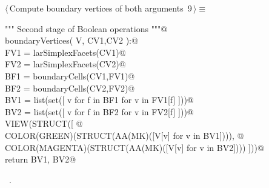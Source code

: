 \documentclass[11pt,oneside]{article}	%
\begin{document}
\begin{flushleft} \small \label{scrap14}
\protect{}$\langle\,$Compute boundary vertices of both arguments\nobreak\ {\footnotesize 9}$\,\rangle\equiv$
\vspace{-1ex}
\begin{list}{}{} \item
\mbox{}\verb@""" Second stage of Boolean operations """@\\
\mbox{}\verb@def boundaryVertices( V, CV1,CV2 ):@\\
\mbox{}\verb@   FV1 = larSimplexFacets(CV1)@\\
\mbox{}\verb@   FV2 = larSimplexFacets(CV2)@\\
\mbox{}\verb@   BF1 = boundaryCells(CV1,FV1)@\\
\mbox{}\verb@   BF2 = boundaryCells(CV2,FV2)@\\
\mbox{}\verb@   BV1 = list(set([ v for f in BF1 for v in FV1[f] ]))@\\
\mbox{}\verb@   BV2 = list(set([ v for f in BF2 for v in FV2[f] ]))@\\
\mbox{}\verb@   VIEW(STRUCT([ @\\
\mbox{}\verb@      COLOR(GREEN)(STRUCT(AA(MK)([V[v] for v in BV1]))), @\\
\mbox{}\verb@      COLOR(MAGENTA)(STRUCT(AA(MK)([V[v] for v in BV2]))) ]))@\\
\mbox{}\verb@   return BV1, BV2@\\
\mbox{}\verb@@{\NWsep}
\end{list}
\vspace{-1ex}
\footnotesize\addtolength{\baselineskip}{-1ex}
\begin{list}{}{\setlength{\itemsep}{-\parsep}\setlength{\itemindent}{-\leftmargin}}
\item \NWtxtMacroRefIn\ .
\end{list}
\end{flushleft}
\end{document}
